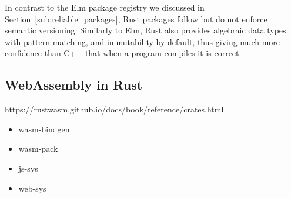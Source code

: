 In contrast to the Elm package registry we discussed in Section~\ref{sub:reliable_packages},
Rust packages follow but do not enforce semantic versioning.
Similarly to Elm, Rust also provides algebraic data types with pattern matching,
and immutability by default, thus giving much more confidence than C++
that when a program compiles it is correct.

\subsection{WebAssembly in Rust}%
\label{sub:wasm_in_rust}

https://rustwasm.github.io/docs/book/reference/crates.html

\begin{itemize}
	\item wasm-bindgen
	\item wasm-pack
	\item js-sys
	\item web-sys
\end{itemize}
